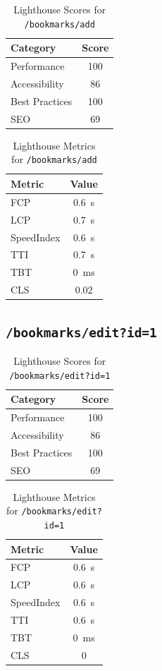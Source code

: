 \begin{table}[H]
  \centering
  \caption{Lighthouse Scores for \texttt{/bookmarks/add}}
  \begin{tabular}{|l|c|}
    \hline
    Category & Score \\ \hline
    Performance & 100 \\ \hline
    Accessibility & 86 \\ \hline
    Best Practices & 100 \\ \hline
    SEO & 69 \\ \hline
  \end{tabular}
\end{table}

\begin{table}[H]
  \centering
  \caption{Lighthouse Metrics for \texttt{/bookmarks/add}}
  \begin{tabular}{|l|c|}
    \hline
    Metric & Value \\ \hline
    FCP & 0.6 s \\ \hline
    LCP & 0.7 s \\ \hline
    SpeedIndex & 0.6 s \\ \hline
    TTI & 0.7 s \\ \hline
    TBT & 0 ms \\ \hline
    CLS & 0.02 \\ \hline
  \end{tabular}
\end{table}
\subsection{\texttt{/bookmarks/edit?id=1}}

\begin{table}[H]
  \centering
  \caption{Lighthouse Scores for \texttt{/bookmarks/edit?id=1}}
  \begin{tabular}{|l|c|}
    \hline
    Category & Score \\ \hline
    Performance & 100 \\ \hline
    Accessibility & 86 \\ \hline
    Best Practices & 100 \\ \hline
    SEO & 69 \\ \hline
  \end{tabular}
\end{table}

\begin{table}[H]
  \centering
  \caption{Lighthouse Metrics for \texttt{/bookmarks/edit?id=1}}
  \begin{tabular}{|l|c|}
    \hline
    Metric & Value \\ \hline
    FCP & 0.6 s \\ \hline
    LCP & 0.6 s \\ \hline
    SpeedIndex & 0.6 s \\ \hline
    TTI & 0.6 s \\ \hline
    TBT & 0 ms \\ \hline
    CLS & 0 \\ \hline
  \end{tabular}
\end{table}
